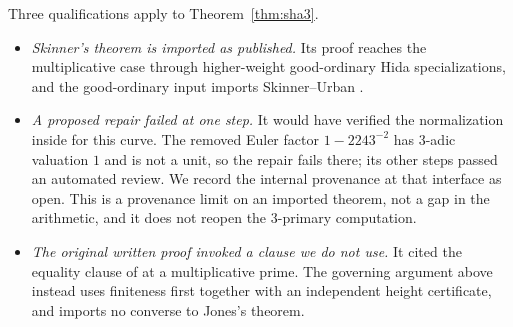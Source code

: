 \begin{remark}[Provenance at $3$]\label{rem:su}
Three qualifications apply to Theorem~\ref{thm:sha3}.
\begin{itemize}[leftmargin=*]
\item \emph{Skinner's theorem is imported as published.} Its proof reaches the multiplicative case through higher-weight good-ordinary Hida specializations, and the good-ordinary input imports Skinner--Urban \cite{su}.
\item \emph{A proposed repair failed at one step.} It would have verified the normalization inside \cite[Prop.~12.3.6]{su} for this curve. The removed Euler factor $1-2243^{-2}$ has $3$-adic valuation $1$ and is not a unit, so the repair fails there; its other steps passed an automated review. We record the internal provenance at that interface as open. This is a provenance limit on an imported theorem, not a gap in the arithmetic, and it does not reopen the $3$-primary computation.
\item \emph{The original written proof invoked a clause we do not use.} It cited the equality clause of \cite[Thm.~6.1]{sw} at a multiplicative prime. The governing argument above instead uses finiteness first together with an independent height certificate, and imports no converse to Jones's theorem.
\end{itemize}
\end{remark}


